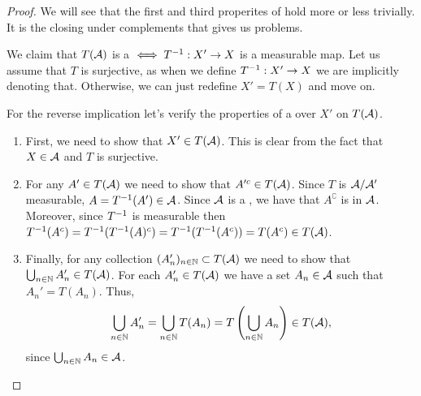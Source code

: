 \begin{proof}
	We will see that the first and third properites of \sigas hold more or less trivially. It is the closing under complements that gives us problems.
	
	We claim that $T(\mathcal{A})$ is a \siga $\iff {T}^{-1}: X' \to X$ is a measurable map. Let us assume that $T$ is surjective, as when we define ${T}^{-1}:X' \to X$ we are implicitly denoting that. Otherwise, we can just redefine $X' = T(X)$ and move on.
	
	For the reverse implication let's verify the properties of a \siga over $X'$ on $T(\mathcal{A})$.
	
	\begin{enumerate}
		\item First, we need to show that $X' \in T(\mathcal{A})$. This is clear from the fact that $X \in \mathcal{A}$ and $T$ is surjective.
		
		\item For any $A' \in T(\mathcal{A})$ we need to show that $A'^c \in T(\mathcal{A})$. Since $T$ is $\mathcal{A}/\mathcal{A}'$ measurable, $A = {T}^{-1}(A') \in \mathcal{A}$. Since $\mathcal{A}$ is a \siga, we have that $A^\complement$ is in $\mathcal{A}$. Moreover, since ${T}^{-1}$ is measurable then ${T}^{-1}(A^c) = {T}^{-1}({T}^{-1}(A)^c) = {T}^{-1}({T}^{-1}(A^c)) = T(A^c) \in T(\mathcal{A})$.
		
		\item Finally, for any collection $(A_n')_{n \in \mathbb{N}} \subset T(\mathcal{A})$ we need to show that $\bigcup_{n \in \mathbb{N}} A_n' \in T(\mathcal{A})$. For each $A_n' \in T(\mathcal{A})$ we have a set $A_n \in \mathcal{A}$ such that $A_n' = T(A_n)$. Thus,
		\begin{align*}
			\bigcup_{n \in \mathbb{N}} A_n' = \bigcup_{n \in \mathbb{N}} T(A_n) = T\left(\bigcup_{n \in \mathbb{N}} A_n\right) \in T(\mathcal{A}),
		\end{align*}
		since $\bigcup_{n \in \mathbb{N}} A_n \in \mathcal{A}$.
	\end{enumerate}
\end{proof}
